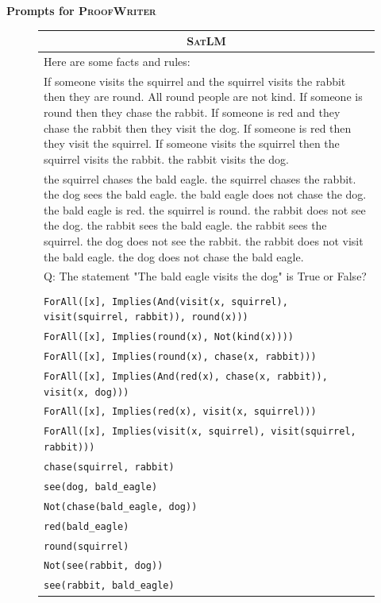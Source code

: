 \documentclass{article}
\theoremstyle{definition}
\newcommand{\proofwriter}{\textsc{ProofWriter}}
\newcommand{\satlm}{\textsc{SatLM}}
\begin{document}
\newpage
\textbf{Prompts for \proofwriter{}}
\begin{figure}[h]
    \footnotesize
    \centering
    \begin{tabularx}{\linewidth}{X}
    \toprule
            \multicolumn{1}{c}{\textbf{\satlm{}} } \\
         \midrule

Here are some facts and rules:\\
If someone visits the squirrel and the squirrel visits the rabbit then they are round.
All round people are not kind.
If someone is round then they chase the rabbit.
If someone is red and they chase the rabbit then they visit the dog.
If someone is red then they visit the squirrel.
If someone visits the squirrel then the squirrel visits the rabbit.
the rabbit visits the dog. \\
the squirrel chases the bald eagle.
the squirrel chases the rabbit.
the dog sees the bald eagle.  
the bald eagle does not chase the dog.
the bald eagle is red.
the squirrel is round.
the rabbit does not see the dog.
the rabbit sees the bald eagle.
the rabbit sees the squirrel.
the dog does not see the rabbit.
the rabbit does not visit the bald eagle.
the dog does not chase the bald eagle. \\
Q: The statement "The bald eagle visits the dog" is True or False? \\
\\
  \tt  ForAll([x], Implies(And(visit(x, squirrel), visit(squirrel, rabbit)), round(x))) \\
   \tt ForAll([x], Implies(round(x), Not(kind(x)))) \\
   \tt  ForAll([x], Implies(round(x), chase(x, rabbit))) \\
    \tt ForAll([x], Implies(And(red(x), chase(x, rabbit)), visit(x, dog)))\\
    \tt ForAll([x], Implies(red(x), visit(x, squirrel))) \\
    \tt ForAll([x], Implies(visit(x, squirrel), visit(squirrel, rabbit)))  \\
  \tt  chase(squirrel, rabbit) \\
    \tt see(dog, bald\_eagle) \\
    \tt Not(chase(bald\_eagle, dog)) \\
    \tt red(bald\_eagle) \\
    \tt round(squirrel) \\
    \tt Not(see(rabbit, dog)) \\
    \tt see(rabbit, bald\_eagle) \\

\end{tabularx}
\end{figure}
\end{document}
